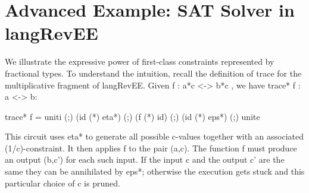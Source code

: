 \documentclass[preprint]{sigplanconf}
\newcommand{\xcomment}[2]{\textbf{#1:~\textsl{#2}}}
\newcommand{\amr}[1]{\xcomment{Amr}{#1}}
\begin{document}
\section{Advanced Example: SAT Solver in {{langRevEE}} }
\label{sec:prog}
\label{sec:sat-solver}



We illustrate the expressive power of first-class constraints represented by
fractional types. To understand the intuition, recall the definition of
{{trace}} for the multiplicative fragment of {{langRevEE}}. 
Given {{f : a*c <-> b*c }}, we have {{trace* f : a <-> b}}: 

{{ trace* f = uniti (;) (id (*) eta*) (;) (f (*) id) (;) (id (*) eps*) (;) unite }}

\noindent This circuit uses {{eta*}} to generate all possible {{c}}-values
together with an associated {{(1/c)}}-constraint. It then applies {{f}} to the
pair {{(a,c)}}. The function {{f}} must produce an output {{(b,c')}} for each
such input. If the input {{c}} and the output {{c'}} are the same they can be
annihilated by {{eps*}}; otherwise the execution gets stuck and this
particular choice of {{c}} is pruned. 

\end{document}
